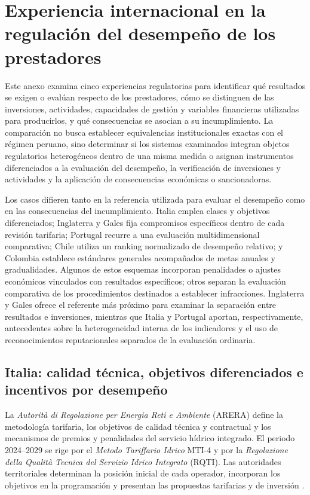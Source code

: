 \section{Experiencia internacional en la regulación del desempeño de los prestadores}
\label{anexo:experiencia_internacional}

Este anexo examina cinco experiencias regulatorias para identificar qué resultados se exigen o evalúan respecto de los prestadores, cómo se distinguen de las inversiones, actividades, capacidades de gestión y variables financieras utilizadas para producirlos, y qué consecuencias se asocian a su incumplimiento. La comparación no busca establecer equivalencias institucionales exactas con el régimen peruano, sino determinar si los sistemas examinados integran objetos regulatorios heterogéneos dentro de una misma medida o asignan instrumentos diferenciados a la evaluación del desempeño, la verificación de inversiones y actividades y la aplicación de consecuencias económicas o sancionadoras.

Los casos difieren tanto en la referencia utilizada para evaluar el desempeño como en las consecuencias del incumplimiento. Italia emplea clases y objetivos diferenciados; Inglaterra y Gales fija compromisos específicos dentro de cada revisión tarifaria; Portugal recurre a una evaluación multidimensional comparativa; Chile utiliza un ranking normalizado de desempeño relativo; y Colombia establece estándares generales acompañados de metas anuales y gradualidades. Algunos de estos esquemas incorporan penalidades o ajustes económicos vinculados con resultados específicos; otros separan la evaluación comparativa de los procedimientos destinados a establecer infracciones. Inglaterra y Gales ofrece el referente más próximo para examinar la separación entre resultados e inversiones, mientras que Italia y Portugal aportan, respectivamente, antecedentes sobre la heterogeneidad interna de los indicadores y el uso de reconocimientos reputacionales separados de la evaluación ordinaria.

\subsection{Italia: calidad técnica, objetivos diferenciados e incentivos por desempeño}
\label{anexo:italia}

La \emph{Autorità di Regolazione per Energia Reti e Ambiente} (ARERA) define la metodología tarifaria, los objetivos de calidad técnica y contractual y los mecanismos de premios y penalidades del servicio hídrico integrado. El periodo 2024--2029 se rige por el \emph{Metodo Tariffario Idrico} MTI-4 y por la \emph{Regolazione della Qualità Tecnica del Servizio Idrico Integrato} (RQTI). Las autoridades territoriales determinan la posición inicial de cada operador, incorporan los objetivos en la programación y presentan las propuestas tarifarias y de inversión \citep{ARERA2023MTI4,ARERA2023RQTI,ARERA2025Assetto}.


